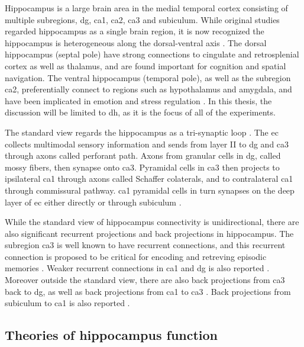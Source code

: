 Hippocampus is a large brain area in the medial temporal cortex consisting of multiple subregions, \gls{dg}, \gls{ca1}, \gls{ca2}, \gls{ca3} and subiculum. While original studies regarded hippocampus as a single brain region, it is now recognized the hippocampus is heterogeneous along the dorsal-ventral axis \citep{moser98, fanselow10}. The dorsal hippocampus (septal pole) have strong connections to cingulate and retrosplenial cortex as well as thalamus, and are found important for cognition and spatial navigation. The ventral hippocampus (temporal pole), as well as the subregion \gls{ca2}, preferentially connect to regions such as hypothalamus and amygdala, and have been implicated in emotion and stress regulation \citep{fanselow10, chevaleyre16}. In this thesis, the discussion will be limited to \gls{dh}, as it is the focus of all of the experiments.

The standard view regards the hippocampus as a tri-synaptic loop \citep{strien09}. The \gls{ec} collects multimodal sensory information and sends from layer II to \gls{dg} and \gls{ca3} through axons called perforant path. Axons from granular cells in \gls{dg}, called mossy fibers, then synapse onto \gls{ca3}. Pyramidal cells in \gls{ca3} then projects to ipsilateral \gls{ca1} through axons called Schaffer colaterals, and to contralateral \gls{ca1} through commissural pathway. \gls{ca1} pyramidal cells in turn synapses on the deep layer of \gls{ec} either directly or through subiculum \citep{strien09}.

While the standard view of hippocampus connectivity is unidirectional, there are also significant recurrent projections and back projections in hippocampus. The subregion \gls{ca3} is well known to have recurrent connections, and this recurrent connection is proposed to be critical for encoding and retreving episodic memories \citep{rolls07, nakazawa02}. Weaker recurrent connections in \gls{ca1} and \gls{dg} is also reported \citep{swanson81, ishizuka90, buckmaster93}. Moreover outside the standard view, there are also back projections from \gls{ca3} back to \gls{dg}, as well as back projections from \gls{ca1} to \gls{ca3} \citep{swanson81, li94}. Back projections from subiculum to \gls{ca1} is also reported \citep{finch83}. 



\subsection{Theories of hippocampus function}

